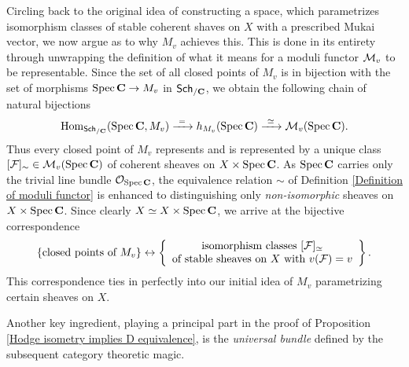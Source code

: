 Circling back to the original idea of constructing a space, which parametrizes isomorphism classes of stable coherent shaves on $X$ with a prescribed Mukai vector, we now argue as to why $M_v$ achieves this. This is done in its entirety through unwrapping the definition of what it means for a moduli functor $\mathcal M_v$ to be representable. Since the set of all closed points of $M_v$ is in bijection with the set of morphisms $\operatorname{Spec}\mathbf C \to M_v$ in $\mathsf{Sch}_{/\mathbf C}$, we obtain the following chain of natural bijections
\begin{equation}
    \label{eq: natural iso applied to SpecC}
    \mathrm{Hom}_{\mathsf{Sch}_{/\mathbf C}}(\operatorname{Spec}\mathbf C, M_v) \xrightarrow{\ = \ } h_{M_v}(\operatorname{Spec}\mathbf C) \xrightarrow{\ \simeq \ } \mathcal M_v(\operatorname{Spec}\mathbf C).
\end{equation}
Thus every closed point of $M_v$ represents and is represented by a unique class $[\mathcal F]_\sim \in \mathcal M_v(\operatorname{Spec}\mathbf C)$ of coherent sheaves on $X \times \operatorname{Spec}\mathbf C$. As $\operatorname{Spec}\mathbf C$ carries only the trivial line bundle ${\mathcal{O}_{\operatorname{Spec}\mathbf C}}$, the equivalence relation $\sim$ of Definition \ref{Definition of moduli functor} is enhanced to distinguishing only \emph{non-isomorphic} sheaves on $X \times \operatorname{Spec}\mathbf C$. Since clearly $X \simeq X \times \operatorname{Spec}\mathbf C$, we arrive at the bijective correspondence
\begin{equation}
    \label{eq: closed points of M}
    \{ \text{closed points of $M_v$}\} 
    \leftrightarrow \left\{
        \begin{array}{c}
            \text{isomorphism classes $[\mathcal F]_\simeq$} \\
            \text{of stable sheaves on $X$ with $v(\mathcal F) = v$}
        \end{array}
        \right\}.
\end{equation}
This correspondence ties in perfectly into our initial idea of $M_v$ parametrizing certain sheaves on $X$.  

Another key ingredient, playing a principal part in the proof of Proposition \ref{Hodge isometry implies D equivalence}, is the \emph{universal bundle} defined by the subsequent category theoretic magic.


